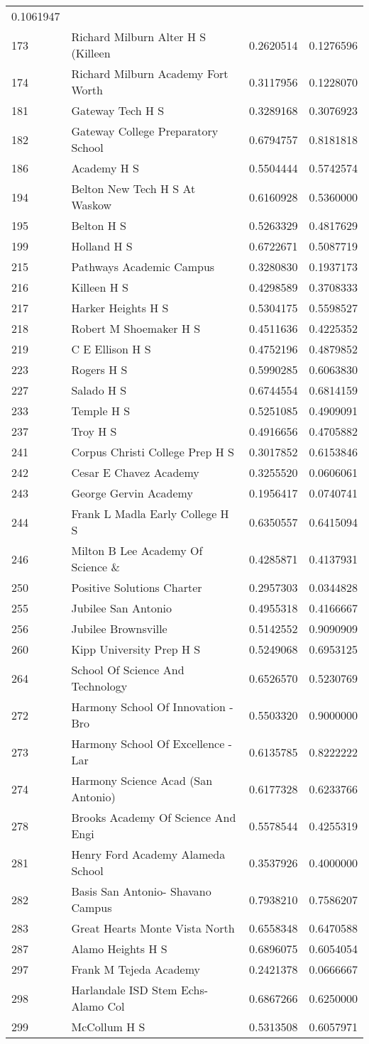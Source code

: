 \documentclass[
]{article}
\begin{document}
\begin{longtable}[]{@{}llrr@{}}
0.1061947\tabularnewline
173 & Richard Milburn Alter H S (Killeen & 0.2620514 &
0.1276596\tabularnewline
174 & Richard Milburn Academy Fort Worth & 0.3117956 &
0.1228070\tabularnewline
181 & Gateway Tech H S & 0.3289168 & 0.3076923\tabularnewline
182 & Gateway College Preparatory School & 0.6794757 &
0.8181818\tabularnewline
186 & Academy H S & 0.5504444 & 0.5742574\tabularnewline
194 & Belton New Tech H S At Waskow & 0.6160928 &
0.5360000\tabularnewline
195 & Belton H S & 0.5263329 & 0.4817629\tabularnewline
199 & Holland H S & 0.6722671 & 0.5087719\tabularnewline
215 & Pathways Academic Campus & 0.3280830 & 0.1937173\tabularnewline
216 & Killeen H S & 0.4298589 & 0.3708333\tabularnewline
217 & Harker Heights H S & 0.5304175 & 0.5598527\tabularnewline
218 & Robert M Shoemaker H S & 0.4511636 & 0.4225352\tabularnewline
219 & C E Ellison H S & 0.4752196 & 0.4879852\tabularnewline
223 & Rogers H S & 0.5990285 & 0.6063830\tabularnewline
227 & Salado H S & 0.6744554 & 0.6814159\tabularnewline
233 & Temple H S & 0.5251085 & 0.4909091\tabularnewline
237 & Troy H S & 0.4916656 & 0.4705882\tabularnewline
241 & Corpus Christi College Prep H S & 0.3017852 &
0.6153846\tabularnewline
242 & Cesar E Chavez Academy & 0.3255520 & 0.0606061\tabularnewline
243 & George Gervin Academy & 0.1956417 & 0.0740741\tabularnewline
244 & Frank L Madla Early College H S & 0.6350557 &
0.6415094\tabularnewline
246 & Milton B Lee Academy Of Science \& & 0.4285871 &
0.4137931\tabularnewline
250 & Positive Solutions Charter & 0.2957303 & 0.0344828\tabularnewline
255 & Jubilee San Antonio & 0.4955318 & 0.4166667\tabularnewline
256 & Jubilee Brownsville & 0.5142552 & 0.9090909\tabularnewline
260 & Kipp University Prep H S & 0.5249068 & 0.6953125\tabularnewline
264 & School Of Science And Technology & 0.6526570 &
0.5230769\tabularnewline
272 & Harmony School Of Innovation - Bro & 0.5503320 &
0.9000000\tabularnewline
273 & Harmony School Of Excellence - Lar & 0.6135785 &
0.8222222\tabularnewline
274 & Harmony Science Acad (San Antonio) & 0.6177328 &
0.6233766\tabularnewline
278 & Brooks Academy Of Science And Engi & 0.5578544 &
0.4255319\tabularnewline
281 & Henry Ford Academy Alameda School & 0.3537926 &
0.4000000\tabularnewline
282 & Basis San Antonio- Shavano Campus & 0.7938210 &
0.7586207\tabularnewline
283 & Great Hearts Monte Vista North & 0.6558348 &
0.6470588\tabularnewline
287 & Alamo Heights H S & 0.6896075 & 0.6054054\tabularnewline
297 & Frank M Tejeda Academy & 0.2421378 & 0.0666667\tabularnewline
298 & Harlandale ISD Stem Echs-Alamo Col & 0.6867266 &
0.6250000\tabularnewline
299 & McCollum H S & 0.5313508 & 0.6057971\tabularnewline

\end{longtable}
\end{document}
